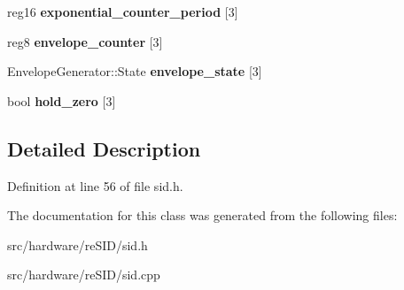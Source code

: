 \begin{DoxyCompactItemize}
\item 
\hypertarget{classSID2_1_1State_a20c37f3ceb79d9273b98ba0248137575}{reg16 {\bfseries exponential\-\_\-counter\-\_\-period} \mbox{[}3\mbox{]}}\label{classSID2_1_1State_a20c37f3ceb79d9273b98ba0248137575}

\item 
\hypertarget{classSID2_1_1State_a6bf1b64e2cbb3e65e01f72c4313e16e3}{reg8 {\bfseries envelope\-\_\-counter} \mbox{[}3\mbox{]}}\label{classSID2_1_1State_a6bf1b64e2cbb3e65e01f72c4313e16e3}

\item 
\hypertarget{classSID2_1_1State_ade48093e96aa20c8bb11593c09c91122}{Envelope\-Generator\-::\-State {\bfseries envelope\-\_\-state} \mbox{[}3\mbox{]}}\label{classSID2_1_1State_ade48093e96aa20c8bb11593c09c91122}

\item 
\hypertarget{classSID2_1_1State_a1ce50784ed0368dac32b5db9d35cd21c}{bool {\bfseries hold\-\_\-zero} \mbox{[}3\mbox{]}}\label{classSID2_1_1State_a1ce50784ed0368dac32b5db9d35cd21c}

\end{DoxyCompactItemize}


\subsection{Detailed Description}


Definition at line 56 of file sid.\-h.



The documentation for this class was generated from the following files\-:\begin{DoxyCompactItemize}
\item 
src/hardware/re\-S\-I\-D/sid.\-h\item 
src/hardware/re\-S\-I\-D/sid.\-cpp\end{DoxyCompactItemize}
